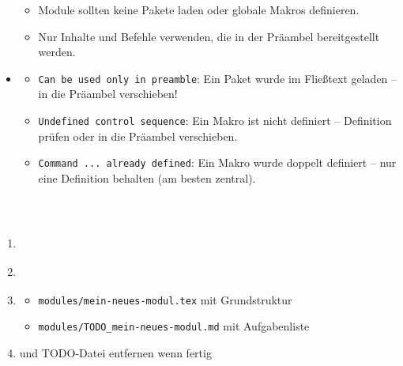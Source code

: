 \begin{itemize}[label=\textcolor{ctmmOrange}{\faArrowRight}]
  \begin{itemize}[label=\textcolor{ctmmOrange}{\faArrowRight}]
  \tightlist
  \item
    Module sollten keine Pakete laden oder globale Makros definieren.
  \item
    Nur Inhalte und Befehle verwenden, die in der Präambel bereitgestellt werden.
  \end{itemize}
\item
  \textbf{\textcolor{ctmmBlue}{\1}}

  \begin{itemize}[label=\textcolor{ctmmOrange}{\faArrowRight}]
  \tightlist
  \item
    \texttt{Can\ be\ used\ only\ in\ preamble}: Ein Paket wurde im Fließtext geladen -- in die Präambel verschieben!
  \item
    \texttt{Undefined\ control\ sequence}: Ein Makro ist nicht definiert -- Definition prüfen oder in die Präambel verschieben.
  \item
    \texttt{Command\ ...\ already\ defined}: Ein Makro wurde doppelt definiert -- nur eine Definition behalten (am besten zentral).
  \end{itemize}
\end{itemize}

\hypertarget{vorgehen-bei-neuen-modulen}{%
\subsubsection{\textcolor{ctmmGreen}{\faList~\1}}\label{vorgehen-bei-neuen-modulen}}

\begin{enumerate}
\def\labelenumi{\arabic{enumi}.}
\item
  \textbf{\textcolor{ctmmBlue}{\1}}

\begin{Shaded}
\begin{Highlighting}\checkbox
{}
\end{Highlighting}
\end{Shaded}
\item
  \textbf{\textcolor{ctmmBlue}{\1}}

\begin{Shaded}
\begin{Highlighting}\checkbox
{}
\end{Highlighting}
\end{Shaded}
\item
  \textbf{\textcolor{ctmmBlue}{\1}}

  \begin{itemize}[label=\textcolor{ctmmOrange}{\faArrowRight}]
  \tightlist
  \item
    \texttt{modules/mein-neues-modul.tex} mit Grundstruktur
  \item
    \texttt{modules/TODO\_mein-neues-modul.md} mit Aufgabenliste
  \end{itemize}
\item
  \textbf{\textcolor{ctmmBlue}{\1}} und TODO-Datei entfernen wenn fertig
\end{enumerate}

